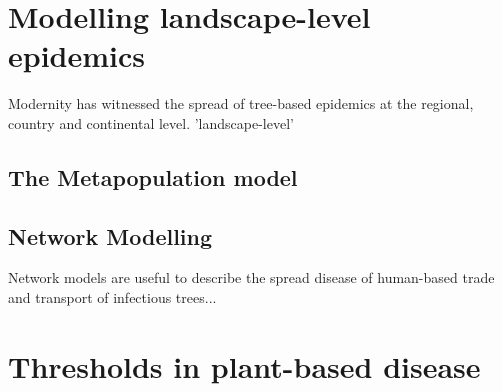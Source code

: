 \section{Modelling landscape-level epidemics}

Modernity has witnessed the spread of tree-based epidemics at the regional, country and continental level. 'landscape-level'

\subsection{The Metapopulation model}
\blindtext

\subsection{Network Modelling}

Network models are useful to describe the spread disease of human-based trade and transport of infectious trees...

\blindtext


\section{Thresholds in plant-based disease}

